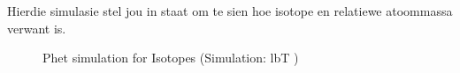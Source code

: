 Hierdie simulasie stel jou in staat om te sien hoe isotope en relatiewe atoommassa verwant is.
    \setcounter{subfigure}{0}
	\begin{figure}[H] %
    \textnormal{Phet simulation for Isotopes} \nopagebreak
  \label{m38806*phet!!!underscore!!!sim}\label{m38806*phet-simulation}
             { (Simulation:  lbT )}
 \end{figure}           \par
\label{m38753*secfhsst!!!underscore!!!id400}



